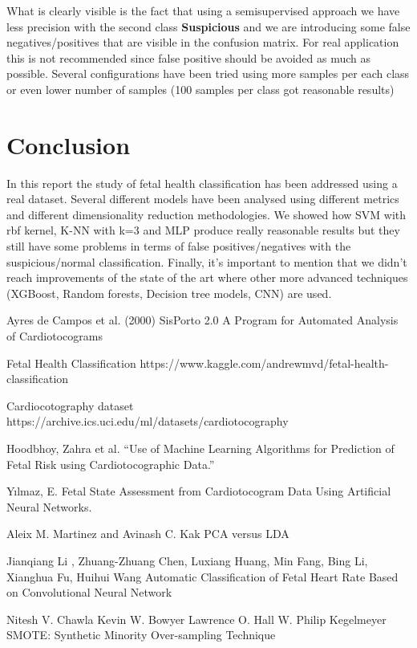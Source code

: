 \documentclass[a4paper,12pt]{article}
\begin{document}
\noindent What is clearly visible is the fact that using a semisupervised approach we have less precision with the second class \textbf{Suspicious} and we are introducing some false negatives/positives that are visible in the confusion matrix. For real application this is not recommended since false positive should be avoided as much as possible. Several configurations have been tried using more samples per each class or even lower number of samples (100 samples per class got reasonable results)

\newpage
\section{Conclusion}

In this report the study of fetal health classification has been addressed using a real dataset. Several different models have been analysed using different metrics and different dimensionality reduction methodologies. We showed how SVM with rbf kernel, K-NN with k=3 and MLP produce really reasonable results but they still have some problems in terms of false positives/negatives with the suspicious/normal classification. Finally, it's important to mention that we didn't reach improvements of the state of the art where other more advanced techniques (XGBoost, Random forests, Decision tree models, CNN) are used. \cite{ann} \cite{cnn}


\begin{thebibliography}{9}
Ayres de Campos et al. (2000) SisPorto 2.0 A Program for Automated Analysis of Cardiotocograms

Fetal Health Classification https://www.kaggle.com/andrewmvd/fetal-health-classification

Cardiocotography dataset https://archive.ics.uci.edu/ml/datasets/cardiotocography

Hoodbhoy, Zahra et al. “Use of Machine Learning Algorithms for Prediction of Fetal Risk using Cardiotocographic Data.”

Yılmaz, E. Fetal State Assessment from Cardiotocogram Data Using Artificial Neural Networks.

Aleix M. Martinez and Avinash C. Kak PCA versus LDA

Jianqiang Li , Zhuang-Zhuang Chen, Luxiang Huang, Min Fang, Bing Li, Xianghua Fu, Huihui Wang Automatic Classification of Fetal Heart Rate Based on Convolutional Neural Network

Nitesh V. Chawla Kevin W. Bowyer Lawrence O. Hall W. Philip Kegelmeyer SMOTE: Synthetic Minority Over-sampling Technique
\end{thebibliography}
\end{document}
